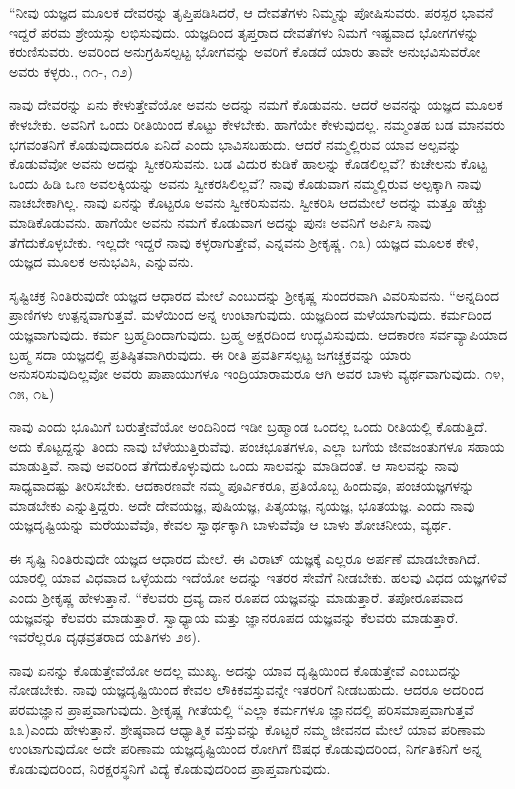 “ನೀವು ಯಜ್ಞದ ಮೂಲಕ ದೇವರನ್ನು ತೃಪ್ತಿಪಡಿಸಿದರೆ, ಆ ದೇವತೆಗಳು ನಿಮ್ಮನ್ನು ಪೋಷಿಸುವರು. ಪರಸ್ಪರ ಭಾವನೆ ಇದ್ದರೆ ಪರಮ ಶ್ರೇಯಸ್ಸು ಲಭಿಸುವುದು. ಯಜ್ಞದಿಂದ ತೃಪ್ತರಾದ ದೇವತೆಗಳು ನಿಮಗೆ ಇಷ್ಟವಾದ ಭೋಗಗಳನ್ನು ಕರುಣಿಸುವರು. ಅವರಿಂದ ಅನುಗ್ರಹಿಸಲ್ಪಟ್ಟ ಭೋಗವನ್ನು ಅವರಿಗೆ ಕೊಡದೆ ಯಾರು ತಾವೇ ಅನುಭವಿಸುವರೋ ಅವರು ಕಳ್ಳರು., ೧೧-, ೧೨)

ನಾವು ದೇವರನ್ನು ಏನು ಕೇಳುತ್ತೇವೆಯೋ ಅವನು ಅದನ್ನು ನಮಗೆ ಕೊಡುವನು. ಆದರೆ ಅವನನ್ನು ಯಜ್ಞದ ಮೂಲಕ ಕೇಳಬೇಕು. ಅವನಿಗೆ ಒಂದು ರೀತಿಯಿಂದ ಕೊಟ್ಟು ಕೇಳಬೇಕು. ಹಾಗೆಯೇ ಕೇಳುವುದಲ್ಲ. ನಮ್ಮಂತಹ ಬಡ ಮಾನವರು ಭಗವಂತನಿಗೆ ಕೊಡುವುದಾದರೂ ಏನಿದೆ ಎಂದು ಭಾವಿಸಬಹುದು. ಆದರೆ ನಮ್ಮಲ್ಲಿರುವ ಯಾವ ಅಲ್ಪವನ್ನು ಕೊಡುವೆವೋ ಅವನು ಅದನ್ನು ಸ್ವೀಕರಿಸುವನು. ಬಡ ವಿದುರ ಕುಡಿಕೆ ಹಾಲನ್ನು ಕೊಡಲಿಲ್ಲವೆ? ಕುಚೇಲನು ಕೊಟ್ಟ ಒಂದು ಹಿಡಿ ಒಣ ಅವಲಕ್ಕಿಯನ್ನು ಅವನು ಸ್ವೀಕರಸಿಲಿಲ್ಲವೆ? ನಾವು ಕೊಡುವಾಗ ನಮ್ಮಲ್ಲಿರುವ ಅಲ್ಪಕ್ಕಾಗಿ ನಾವು ನಾಚಬೇಕಾಗಿಲ್ಲ. ನಾವು ಏನನ್ನು ಕೊಟ್ಟರೂ ಅವನು ಸ್ವೀಕರಿಸುವನು. ಸ್ವೀಕರಿಸಿ ಆದಮೇಲೆ ಅದನ್ನು ಮತ್ತೂ ಹೆಚ್ಚು ಮಾಡಿಕೊಡುವನು. ಹಾಗೆಯೇ ಅವನು ನಮಗೆ ಕೊಡುವಾಗ ಅದನ್ನು ಪುನಃ ಅವನಿಗೆ ಅರ್ಪಿಸಿ ನಾವು ತೆಗೆದುಕೊಳ್ಳಬೇಕು. ಇಲ್ಲದೇ ಇದ್ದರೆ ನಾವು ಕಳ್ಳರಾಗುತ್ತೇವೆ, ಎನ್ನವನು ಶ‍್ರೀಕೃಷ್ಣ. ೧೩) ಯಜ್ಞದ ಮೂಲಕ ಕೇಳಿ, ಯಜ್ಞದ ಮೂಲಕ ಅನುಭವಿಸಿ, ಎನ್ನುವನು.

ಸೃಷ್ಟಿಚಕ್ರ ನಿಂತಿರುವುದೇ ಯಜ್ಞದ ಆಧಾರದ ಮೇಲೆ ಎಂಬುದನ್ನು ಶ‍್ರೀಕೃಷ್ಣ ಸುಂದರವಾಗಿ ವಿವರಿಸುವನು. “ಅನ್ನದಿಂದ ಪ್ರಾಣಿಗಳು ಉತ್ಪನ್ನವಾಗುತ್ತವೆ. ಮಳೆಯಿಂದ ಅನ್ನ ಉಂಟಾಗುವುದು. ಯಜ್ಞದಿಂದ ಮಳೆಯಾಗುವುದು. ಕರ್ಮದಿಂದ ಯಜ್ಞವಾಗುವುದು. ಕರ್ಮ ಬ್ರಹ್ಮದಿಂದಾಗುವುದು. ಬ್ರಹ್ಮ ಅಕ್ಷರದಿಂದ ಉದ್ಭವಿಸುವುದು. ಆದಕಾರಣ ಸರ್ವವ್ಯಾಪಿಯಾದ ಬ್ರಹ್ಮ ಸದಾ ಯಜ್ಞದಲ್ಲಿ ಪ್ರತಿಷ್ಠಿತವಾಗಿರುವುದು. ಈ ರೀತಿ ಪ್ರವರ್ತಿಸಲ್ಪಟ್ಟ ಜಗಚ್ಚಕ್ರವನ್ನು ಯಾರು ಅನುಸರಿಸುವುದಿಲ್ಲವೋ ಅವರು ಪಾಪಾಯುಗಳೂ ಇಂದ್ರಿಯಾರಾಮರೂ ಆಗಿ ಅವರ ಬಾಳು ವ್ಯರ್ಥವಾಗುವುದು.  ೧೪, ೧೫, ೧೬)

ನಾವು ಎಂದು ಭೂಮಿಗೆ ಬರುತ್ತೇವೆಯೋ ಅಂದಿನಿಂದ ಇಡೀ ಬ್ರಹ್ಮಾಂಡ ಒಂದಲ್ಲ ಒಂದು ರೀತಿಯಲ್ಲಿ ಕೊಡುತ್ತಿದೆ. ಅದು ಕೊಟ್ಟದ್ದನ್ನು ತಿಂದು ನಾವು ಬೆಳೆಯುತ್ತಿರುವೆವು. ಪಂಚಭೂತಗಳೂ, ಎಲ್ಲಾ ಬಗೆಯ ಜೀವಜಂತುಗಳೂ ಸಹಾಯ ಮಾಡುತ್ತಿವೆ. ನಾವು ಅವರಿಂದ ತೆಗೆದುಕೊಳ್ಳುವುದು ಒಂದು ಸಾಲವನ್ನು ಮಾಡಿದಂತೆ. ಆ ಸಾಲವನ್ನು ನಾವು ಸಾಧ್ಯವಾದಷ್ಟು ತೀರಿಸಬೇಕು. ಆದಕಾರಣವೇ ನಮ್ಮ ಪೂರ್ವಿಕರೂ, ಪ್ರತಿಯೊಬ್ಬ ಹಿಂದುವೂ, ಪಂಚಯಜ್ಞಗಳನ್ನು ಮಾಡಬೇಕು ಎನ್ನುತ್ತಿದ್ದರು. ಅದೇ ದೇವಯಜ್ಞ, ಪುಷಿಯಜ್ಞ, ಪಿತೃಯಜ್ಞ, ನೃಯಜ್ಞ, ಭೂತಯಜ್ಞ. ಎಂದು ನಾವು ಯಜ್ಞದೃಷ್ಟಿಯನ್ನು ಮರೆಯುವೆವೊ, ಕೇವಲ ಸ್ವಾರ್ಥಕ್ಕಾಗಿ ಬಾಳುವೆವೊ ಆ ಬಾಳು ಶೋಚನೀಯ, ವ್ಯರ್ಥ.

ಈ ಸೃಷ್ಟಿ ನಿಂತಿರುವುದೇ ಯಜ್ಞದ ಆಧಾರದ ಮೇಲೆ. ಈ ವಿರಾಟ್ ಯಜ್ಞಕ್ಕೆ ಎಲ್ಲರೂ ಅರ್ಪಣೆ ಮಾಡಬೇಕಾಗಿದೆ. ಯಾರಲ್ಲಿ ಯಾವ ವಿಧವಾದ ಒಳ್ಳೆಯದು ಇದೆಯೋ ಅದನ್ನು ಇತರರ ಸೇವೆಗೆ ನೀಡಬೇಕು. ಹಲವು ವಿಧದ ಯಜ್ಞಗಳಿವೆ ಎಂದು ಶ‍್ರೀಕೃಷ್ಣ ಹೇಳುತ್ತಾನೆ. “ಕೆಲವರು ದ್ರವ್ಯ ದಾನ ರೂಪದ ಯಜ್ಞವನ್ನು ಮಾಡುತ್ತಾರೆ. ತಪೋರೂಪವಾದ ಯಜ್ಞವನ್ನು ಕೆಲವರು ಮಾಡುತ್ತಾರೆ. ಸ್ವಾಧ್ಯಾಯ ಮತ್ತು ಜ್ಞಾನರೂಪದ ಯಜ್ಞವನ್ನು ಕೆಲವರು ಮಾಡುತ್ತಾರೆ. ಇವರೆಲ್ಲರೂ ದೃಢವ್ರತರಾದ ಯತಿಗಳು ೨೮).

\newpage

ನಾವು ಏನನ್ನು ಕೊಡುತ್ತೇವೆಯೋ ಅದಲ್ಲ ಮುಖ್ಯ. ಅದನ್ನು ಯಾವ ದೃಷ್ಟಿಯಿಂದ ಕೊಡುತ್ತೇವೆ ಎಂಬುದನ್ನು ನೋಡಬೇಕು. ನಾವು ಯಜ್ಞದೃಷ್ಟಿಯಿಂದ ಕೇವಲ ಲೌಕಿಕವಸ್ತುವನ್ನೇ ಇತರರಿಗೆ ನೀಡಬಹುದು. ಆದರೂ ಅದರಿಂದ ಪರಮಜ್ಞಾನ ಪ್ರಾಪ್ತವಾಗುವುದು. ಶ‍್ರೀಕೃಷ್ಣ ಗೀತೆಯಲ್ಲಿ “ಎಲ್ಲಾ ಕರ್ಮಗಳೂ ಜ್ಞಾನದಲ್ಲಿ ಪರಿಸಮಾಪ್ತವಾಗುತ್ತವೆ ೩೩)ಎಂದು ಹೇಳುತ್ತಾನೆ. ಶ್ರೇಷ್ಠವಾದ ಆಧ್ಯಾತ್ಮಿಕ ವಸ್ತುವನ್ನು ಕೊಟ್ಟರೆ ನಮ್ಮ ಜೀವನದ ಮೇಲೆ ಯಾವ ಪರಿಣಾಮ ಉಂಟಾಗುವುದೋ ಅದೇ ಪರಿಣಾಮ ಯಜ್ಞದೃಷ್ಟಿಯಿಂದ ರೋಗಿಗೆ ಔಷಧ ಕೊಡುವುದರಿಂದ, ನಿರ್ಗತಿಕನಿಗೆ ಅನ್ನ ಕೊಡುವುದರಿಂದ, ನಿರಕ್ಷರಸ್ಥನಿಗೆ ವಿದ್ಯೆ ಕೊಡುವುದರಿಂದ ಪ್ರಾಪ್ತವಾಗುವುದು.

